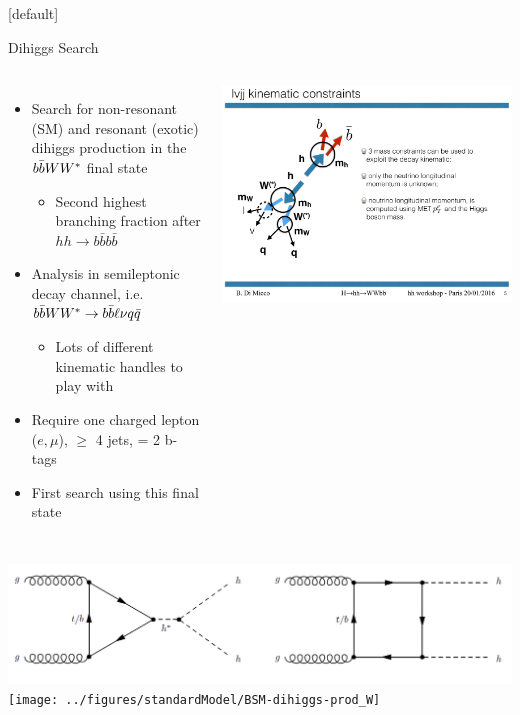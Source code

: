 \documentclass{beamer}
\newcommand*{\bbWW}{\ensuremath{\lowercase{b\bar{b}}WW^*}\xspace}
\newcommand{\bbbar}{\ensuremath{b\bar{b}}\xspace}
\begin{document}
{  \makeatletter %
  [default]
  \def\beamer@entrycode{\vspace*{-1.075\headheight}}
  \begin{frame}{Dihiggs Search}
    \begin{columns}
      \begin{itemize}\small
      \item Search for non-resonant (SM) and resonant (exotic) dihiggs production in the \bbWW final state
        \begin{itemize} \footnotesize 
        \item Second highest branching fraction after $hh\rightarrow \bbbar\bbbar$ \end{itemize}
      \item Analysis in semileptonic decay channel, i.e. $\bbWW \rightarrow \bbbar\ell\nu q\bar{q}$
        \begin{itemize} \footnotesize  
        \item Lots of different kinematic handles to play with
        \end{itemize}
      \item Require one charged lepton ($e,\mu$), $\geq$ 4 jets, = 2 b-tags 
      \item First search using this final state
      \end{itemize}
      \includegraphics[width=\textwidth]{../chapters/dihiggs2/figures/cartoon_hh}
    \end{columns}  
    \begin{columns}
      \includegraphics[width=\textwidth]{figures/SM-diHiggs-production}
      \texttt{[image: ../figures/standardModel/BSM-dihiggs-prod\_W]}
    \end{columns}
  \end{frame}

}
\end{document}
